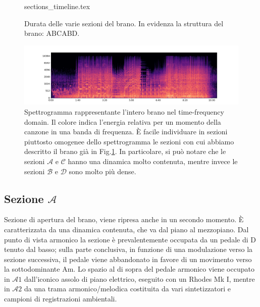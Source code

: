 \documentclass[class=book, crop=false, oneside, 12pt]{standalone}
\begin{document}
    \begin{figure}[htbp]
        \centering
        {sections_timeline.tex}
        \caption[Durata delle varie sezioni del brano.]{Durata delle varie sezioni del brano. In evidenza la struttura del brano: ABCABD.}
        \label{fig:04-sections-timeline}
    \end{figure}

    \begin{figure}[htbp]
        \centering
        \includegraphics[width=\textwidth]{sheep_spectrogram.png}
        \caption[Spettrogramma rappresentante l'intero brano nel time-frequency domain.]{Spettrogramma rappresentante l'intero brano nel time-frequency domain. Il colore indica l'energia relativa per un momento della canzone in una banda di frequenza. È facile individuare in sezioni piuttosto omogenee dello spettrogramma le sezioni con cui abbiamo descritto il brano già in Fig.\ref{fig:04-sections-timeline}. In particolare, si può notare che  le sezioni \(\mathcal{A}\) e \(\mathcal{C}\) hanno una dinamica molto contenuta, mentre invece le sezioni \(\mathcal{B}\) e \(\mathcal{D}\) sono molto più dense.}
        \label{fig:sheep-spectrogram}
    \end{figure}

    \subsection{Sezione \(\mathcal{A}\)}
    Sezione di apertura del brano, viene ripresa anche in un secondo momento. È caratterizzata da una dinamica contenuta, che va dal piano al mezzopiano. Dal punto di vista armonico la sezione è prevalentemente occupata da un pedale di D tenuto dal basso; sulla parte conclusiva, in funzione di una modulazione verso la sezione successiva, il pedale viene abbandonato in favore di un movimento verso la sottodominante Am. Lo spazio al di sopra del pedale armonico viene occupato in \(\mathcal{A}1\) dall'iconico assolo di piano elettrico, eseguito con un Rhodes Mk I, mentre in \(\mathcal{A}2\) da una trama armonico/melodica costituita da vari sintetizzatori e campioni di registrazioni ambientali.
\end{document}
